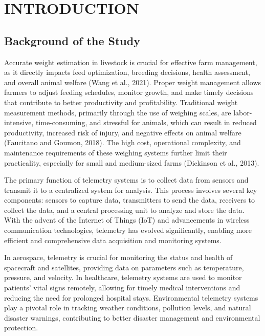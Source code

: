 \chapter{INTRODUCTION}

{\baselineskip

\section{Background of the Study}

Accurate weight estimation in livestock is crucial for effective farm management, as it directly impacts feed optimization, breeding decisions, health assessment, and overall animal welfare (Wang et al., 2021). Proper weight management allows farmers to adjust feeding schedules, monitor growth, and make timely decisions that contribute to better productivity and profitability. Traditional weight measurement methods, primarily through the use of weighing scales, are labor-intensive, time-consuming, and stressful for animals, which can result in reduced productivity, increased risk of injury, and negative effects on animal welfare (Faucitano and Goumon, 2018). The high cost, operational complexity, and maintenance requirements of these weighing systems further limit their practicality, especially for small and medium-sized farms (Dickinson et al., 2013).


The primary function of telemetry systems is to collect data from sensors and transmit it to a centralized system for analysis. This process involves several key components: sensors to capture data, transmitters to send the data, receivers to collect the data, and a central processing unit to analyze and store the data. With the advent of the Internet of Things (IoT) and advancements in wireless communication technologies, telemetry has evolved significantly, enabling more efficient and comprehensive data acquisition and monitoring systems. 

In aerospace, telemetry is crucial for monitoring the status and health of spacecraft and satellites, providing data on parameters such as temperature, pressure, and velocity. In healthcare, telemetry systems are used to monitor patients' vital signs remotely, allowing for timely medical interventions and reducing the need for prolonged hospital stays. Environmental telemetry systems play a pivotal role in tracking weather conditions, pollution levels, and natural disaster warnings, contributing to better disaster management and environmental protection.

}
